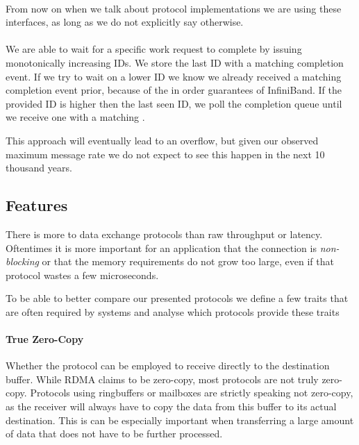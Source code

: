 \paragraph{} From now on when we talk about protocol implementations we are using these interfaces, as long as we do not 
explicitly say otherwise.



\paragraph{} We are able to wait for a specific work request to complete by issuing monotonically increasing IDs. We store the
last ID with a matching completion event. If we try to wait on a lower ID we know we already received a matching completion 
event prior, because of the in order guarantees of InfiniBand. If the provided ID is higher then the
last seen ID, we  poll the completion queue until we receive one with a matching .

This approach will eventually lead to an overflow, but given our observed maximum message rate we do not expect to see this 
happen in the next 10 thousand years. 



\pagebreak

\subsection{Features}

There is more to data exchange protocols than raw throughput or latency. Oftentimes it is more important for an application
that the connection is \emph{non-blocking} or that the memory requirements do not grow too large, even if that protocol wastes
a few microseconds.

To be able to better compare our presented protocols we define a few traits that are often required by systems and
analyse which protocols provide these traits

\paragraph{True Zero-Copy} Whether the protocol can be employed to receive directly to the destination buffer. While RDMA 
claims to be zero-copy, most protocols are not truly zero-copy. Protocols using ringbuffers or mailboxes are
strictly speaking not zero-copy, as the receiver will always have to copy the data from this buffer to its actual destination.
This is can be especially important when transferring a large amount of data that does not have to be further processed.

